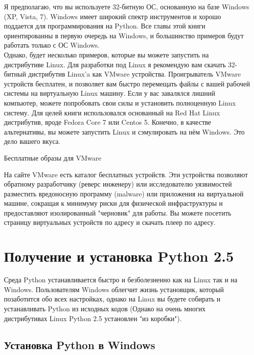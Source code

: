 \documentclass[12pt, a4paper, oneside]{book}
\begin{document}
Я предполагаю, что вы используете 32-битную ОС, основанную на базе Windows (XP, Vista, 7). Windows имеет широкий спектр инструментов и хорошо поддается для программирования на Python. Все главы этой книги ориентированны в первую очередь на Windows, и большинство примеров будут работать только с ОС Windows.\\

Однако, будет несколько примеров, которые вы можете запустить на дистрибутиве Linux. Для разработки под Linux я рекомендую вам скачать 32-битный дистрибутив Linux'a как VMware устройства. Проигрыватель VMware устройств бесплатен, и позволяет вам быстро перемещать файлы с вашей рабочей системы на виртуальную Linux машину. Если у вас завалялся лишний компьютер, можете попробовать свои силы и установить полноценную Linux систему. Для целей книги использовался основанный на Red Hat Linux дистрибутив, вроде Fedora Core 7 или Centos 5. Конечно, в качестве альтернативы, вы можете запустить Linux и сэмулировать на нём Windows. Это дело вашего вкуса.\\

\begin{bclogo}{Бесплатные образы для VMware}

На сайте VMware есть каталог бесплатных устройств. Эти устройства позволяют обратному разработчику (реверс инженеру) или исследователю уязвимостей разместить вредоносную программу (malware) или приложения на виртуальной машине, сокращая к минимуму риски для физической инфраструктуры и предоставляют изолированный "черновик" для работы. Вы можете посетить страницу виртуальных устройств по адресу и скачать плеер по адресу.
\end{bclogo}

\section{Получение и установка Python 2.5}

Среда Python устанавливается быстро и безболезненно как на Linux так и на Windows. Пользователям Windows облегчит жизнь установщик, который позаботится обо всех настройках, однако на Linux вы будете собирать и устанавливать Python из исходных кодов (Однако на очень многих дистрибутивах Linux Python 2.5 установлен "из коробки").

\subsection{Установка Python в Windows}
\end{document}
